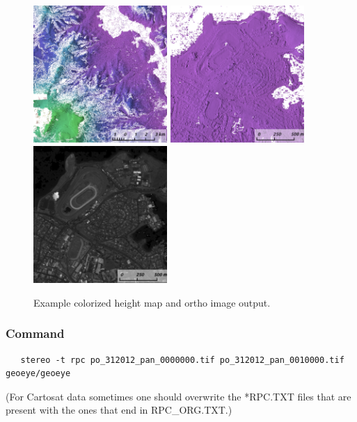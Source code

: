 \begin{figure}[h!]
\centering
  \includegraphics[width=2.0in]{images/examples/geoeye/GeoEye_ContextRender_400px.png}
  \includegraphics[width=2.0in]{images/examples/geoeye/GeoEye_CloseUp_400px.png}
  \includegraphics[width=2.0in]{images/examples/geoeye/GeoEye_CloseUpDRG_400px.png}
\caption{Example colorized height map and ortho image output.}
\label{fig:geoeye-nomap-example}
\end{figure}

\subsubsection*{Command}

\begin{verbatim}
   stereo -t rpc po_312012_pan_0000000.tif po_312012_pan_0010000.tif geoeye/geoeye
\end{verbatim}

(For Cartosat data sometimes one should overwrite the *RPC.TXT files that are present
with the ones that end in RPC\_ORG.TXT.)

